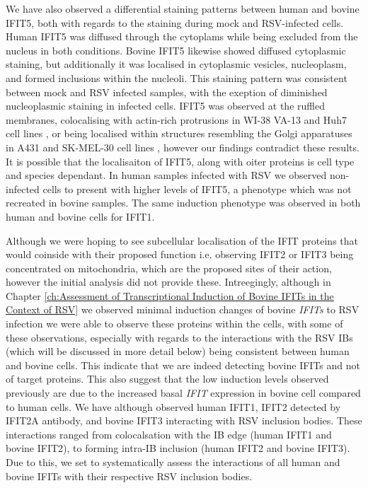 We have also observed a differential staining patterns between human and bovine IFIT5, both with regards to the staining during mock and RSV-infected cells. Human IFIT5 was diffused through the cytoplams while being excluded from the nucleus in both conditions. Bovine IFIT5 likewise showed diffused cytoplasmic staining, but additionally it was localised in cytoplasmic vesicles, nucleoplasm, and formed inclusions within the nucleoli. This staining pattern was consistent between mock and RSV infected samples, with the exeption of diminished nucleoplasmic staining in infected cells. IFIT5 was observed at the ruffled membranes, colocalising with actin-rich protrusions in WI-38 VA-13 and Huh7 cell lines \cite{Katibah2013TRNAIFIT5}, or being localised within structures resembling the Golgi apparatuses in A431 and SK-MEL-30 cell lines \cite{Thul2017AProteome}, however our findings contradict these results. It is possible that the localisaiton of IFIT5, along with oiter proteins is cell type and species dependant. In human samples infected with RSV we observed non-infected cells to present with higher levels of IFIT5, a phenotype which was not recreated in bovine samples. The same induction phenotype was observed in both human and bovine cells for IFIT1.

Although we were hoping to see subcellular localisation of the IFIT proteins that would coinside with their proposed function i.e. observing IFIT2 or IFIT3 being concentrated on mitochondria, which are the proposed sites of their action, however the initial analysis did not provide these. Intreegingly, although in Chapter \ref{ch:Assessment of Transcriptional Induction of Bovine IFITs in the Context of RSV} we observed minimal induction changes of bovine \textit{IFITs} to RSV infection we were able to observe these proteins within the cells, with some of these observations, especially with regards to the interactions with the RSV IBs (which will be discussed in more detail below) being consistent between human and bovine cells. This indicate that we are indeed detecting bovine IFITs and not of target proteins. This also suggest that the low induction levels observed previously are due to the increased basal \textit{IFIT} expression in bovine cell compared to human cells. We have although observed human IFIT1, IFIT2 detected by IFIT2A antibody, and bovine IFIT3 interacting with RSV inclusion bodies. These interactions ranged from colocalsation with the IB edge (human IFIT1 and bovine IFIT2), to forming intra-IB inclusion (human IFIT2 and bovine IFIT3). Due to this, we set to systematically assess the interactions of all human and bovine IFITs with their respective RSV inclusion bodies.



